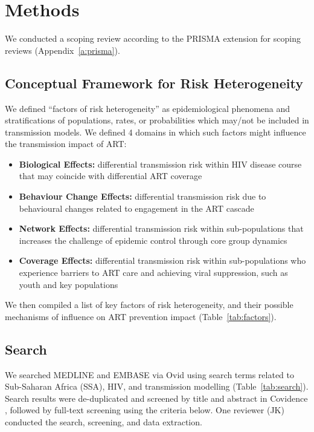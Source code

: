 \section{Methods}
\label{s:meth}
We conducted a scoping review according to the PRISMA extension for scoping reviews
(Appendix~\ref{a:prisma}).
\subsection{Conceptual Framework for Risk Heterogeneity}
\label{ss:meth:framework}
We defined ``factors of risk heterogeneity'' as
epidemiological phenomena and stratifications of populations, rates, or probabilities
which may/not be included in transmission models.
We defined 4 domains in which such factors might influence the transmission impact of ART:
\begin{itemize}
  \item \textbf{Biological Effects:}
  differential transmission risk within HIV disease course
  that may coincide with differential ART coverage
  \cite{Pilcher2004}
  \item \textbf{Behaviour Change Effects:}
  differential transmission risk due to
  behavioural changes related to engagement in the ART cascade
  \cite{Ramachandran2016,Tiwari2020}
  \item \textbf{Network Effects:}
  differential transmission risk within sub-populations
  that increases the challenge of epidemic control through core group dynamics
  \cite{Boily1997,Watts2010,Dodd2010}
  \item \textbf{Coverage Effects:}
  differential transmission risk within sub-populations
  who experience barriers to ART care and achieving viral suppression,
  such as youth and key populations
  \cite{Mountain2014,Lancaster2016,Hakim2018,Green2020}
\end{itemize}
We then compiled a list of key factors of risk heterogeneity,
and their possible mechanisms of influence on ART prevention impact (Table~\ref{tab:factors}).
\begin{sidewaystable}
  \caption{%
    Factors of heterogeneity in HIV transmission
    and their possible mechanisms of influence on the prevention impact of ART interventions}
  
  \label{tab:factors}
\end{sidewaystable}
\subsection{Search}
\label{ss:meth:search}
We searched MEDLINE and EMBASE via Ovid
using search terms related to Sub-Saharan Africa (SSA), HIV, and transmission modelling
(Table~\ref{tab:search}).
Search results were de-duplicated and screened by title and abstract in Covidence \cite{Covidence},
followed by full-text screening using the criteria below.
One reviewer (JK) conducted the search, screening, and data extraction.
